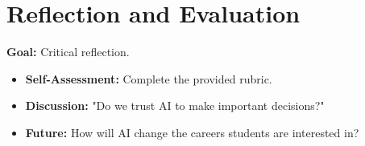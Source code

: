 \documentclass[11pt, a4paper]{article}
\begin{document}
\section{Reflection and Evaluation}
\textbf{Goal:} Critical reflection.
\begin{itemize}
    \item \textbf{Self-Assessment:} Complete the provided rubric.
    \item \textbf{Discussion:} "Do we trust AI to make important decisions?"
    \item \textbf{Future:} How will AI change the careers students are interested in?
\end{itemize}
\end{document}
